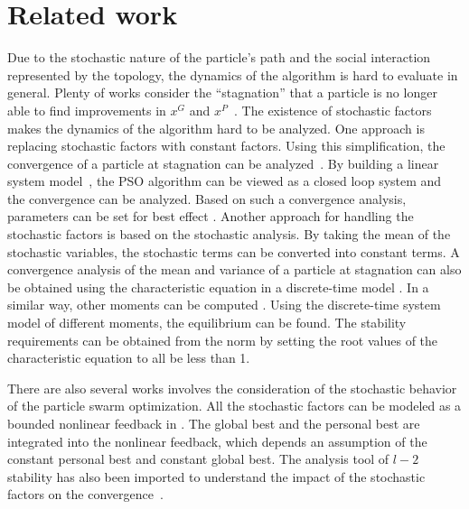 \section{Related work}
\label{sec:rel_work}

Due to the stochastic nature of the particle's path and the social interaction represented by the topology, the dynamics of the algorithm is hard to evaluate in general.
Plenty of works consider the ``stagnation'' that a particle is no longer able to find improvements in $ x^{G} $ and $ x^{P} $~\cite{Clerc06stagnationanalysis}.
The existence of stochastic factors makes the dynamics of the algorithm hard to be analyzed.
One approach is replacing stochastic factors with constant factors.
Using this simplification, the convergence of a particle at stagnation can be analyzed~\cite{985692}. 
By building a linear system model~\cite{4424687}, the PSO algorithm can be viewed as a closed loop system and the convergence can be analyzed.
Based on such a convergence analysis, parameters can be set for best effect \cite{Trelea2003317}.
Another approach for handling the stochastic factors is based on the stochastic analysis.
By taking the mean of the stochastic variables, the stochastic terms can be converted into
constant terms.
A convergence analysis of the mean and variance of a particle at stagnation can also be obtained using the characteristic equation in a discrete-time model 
\cite{Jiang20078}.
In a similar way, 
other moments can be computed
\cite{5175367,Poli:2007:EAS:1276958.1276977,Poli:2008:DSS:1384929.1384944}.
Using the discrete-time system model of different moments, the equilibrium can be found.
The stability requirements can be obtained from the norm by setting the root values of the characteristic equation to all be less than 1.

There are also several works involves the consideration of the stochastic behavior of the particle swarm optimization.
All the stochastic factors can be modeled as a bounded nonlinear feedback in \cite{1637686}.
The global best and the personal best are integrated into the nonlinear feedback, which depends an assumption of the constant personal best and constant global best.
The analysis tool of $ l-2 $ stability has also been imported to understand the impact of the stochastic factors on the convergence~\cite{5160341}.


